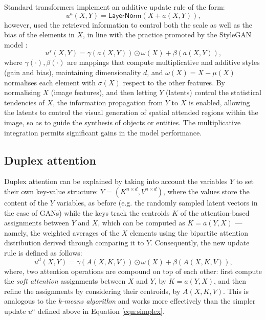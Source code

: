 \documentclass{article}
\begin{document}
	Standard transformers implement an additive update rule of the form:
	\begin{equation}
		\label{eqn:layernorm}
		u^a(X, Y)=\mathsf{LayerNorm}(X + a(X, Y)) \mbox{,}
	\end{equation}
	however, \cite{hudson2021generative} used the retrieved information to control both the scale as 
	well as the bias of the elements in $X$, in line with the practice promoted by the StyleGAN model 
	\cite{karras2019style}:
	\begin{equation}
		\label{eqn:simplex}
		u^s(X, Y)=\gamma (a(X, Y)) \odot \omega (X) + \beta (a(X, Y)) \mbox{,}
	\end{equation}
	where $\gamma(\cdot), \beta(\cdot)$ are mappings that compute multiplicative and additive styles 
	(gain and bias), maintaining dimensionality $d$, and $\omega (X) = X- \mu(X)$ normalises each 
	element with $\sigma(X)$ respect to the other features. By normalising $X$ (image features), and 
	then letting $Y$ (latents) control the statistical tendencies of $X$, the information propagation from 
	$Y$ to $X$ is enabled, allowing the latents to control the visual generation of spatial attended 
	regions within the image, so as to guide the synthesis of objects or entities.
	The multiplicative integration permits significant gains in the model performance. 
	
	\subsection{Duplex attention}
	Duplex attention can be explained by taking into account the variables $Y$ to set their own 
	key-value structure: $Y = (K^{n\times d} , V^{n\times d})$, where the values store the content of the 
	$Y$ variables, as before (e.g. the randomly sampled latent vectors in the case of GANs) while the 
	keys track the centroids $K$ of the attention-based assignments between $Y$ and $X$, which can 
	be computed as $K = a(Y, X)$ — namely, the weighted averages of the $X$ elements using the 
	bipartite attention distribution derived through comparing it to $Y$. 
	Consequently, the new update rule is defined as follows:
	\begin{equation}
		\label{eqn:duplex}
		u^d(X, Y )=\gamma (A(X, K, V)) \odot \omega (X) + \beta (A(X, K, V)) \mbox{,}
	\end{equation}
	where, two attention operations are compound on top of each other: first compute the \textit{soft 
	attention} assignments between $X$ and $Y$, by $K = a(Y, X)$, and then refine the assignments by 
	considering their centroids, by $A(X, K, V)$. This is analogous to the \textit{k-means algorithm} and 
	works more effectively than the simpler update $u^a$ defined above in Equation \eqref{eqn:simplex}.
	
\end{document}
